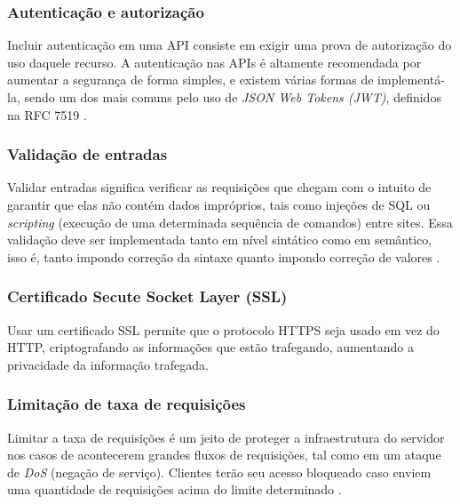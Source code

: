 \subsubsection*{Autenticação e autorização}

Incluir autenticação em uma API consiste em exigir uma prova de autorização do uso daquele recurso. A autenticação nas APIs é altamente recomendada por aumentar a segurança de forma simples, e existem várias formas de implementá-la, sendo um dos mais comuns pelo uso de \emph{JSON Web Tokens (JWT)}, definidos na RFC 7519 \cite{rfc_http_nielsen_1999}.

\subsubsection*{Validação de entradas}

Validar entradas significa verificar as requisições que chegam com o intuito de garantir que elas não contém dados impróprios, tais como injeções de SQL ou \emph{scripting} (execução de uma determinada sequência de comandos) entre sites. Essa validação deve ser implementada tanto em nível sintático como em semântico, isso é, tanto impondo correção da sintaxe quanto impondo correção de valores \cite{api-design-restfulapi}.

\subsubsection*{Certificado Secute Socket Layer (SSL)}
Usar um certificado SSL permite que o protocolo HTTPS seja usado em vez do HTTP, criptografando as informações que estão trafegando, aumentando a privacidade da informação trafegada. \cite{api-design-restfulapi}

\subsubsection*{Limitação de taxa de requisições}
Limitar a taxa de requisições é um jeito de proteger a infraestrutura do servidor nos casos de acontecerem grandes fluxos de requisições, tal como em um ataque de \emph{DoS} (negação de serviço). Clientes terão seu acesso bloqueado caso enviem uma quantidade de requisições acima do limite determinado \cite{api-design-restfulapi}.


